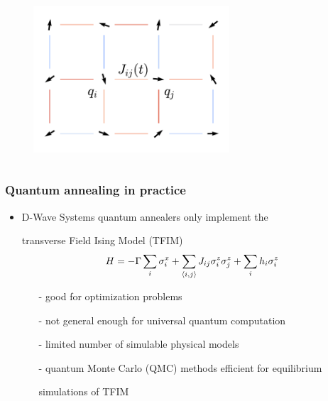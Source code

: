 \documentclass[11pt]{beamer}
\newcommand{\itemb}{\item[$\bullet$]}
\begin{document}
\begin{frame}
\begin{columns}[T]
\begin{column}{0.55\textwidth}
            \begin{figure}[!htb]
                \centering
                \vspace*{-0.3cm}
                \includegraphics[width=0.65\textwidth]{../plots/lattice.pdf}
                \label{fig:annealing}
            \end{figure}
        \end{column}
    \end{columns}
\end{frame}

\begin{frame}
    \frametitle{Quantum annealing in practice}
    \begin{itemize}
        \setlength{\itemindent}{-1em}
        \itemb D-Wave Systems quantum annealers only implement the
        \item [] transverse Field Ising Model (TFIM)
        \begin{equation*}
            H =  - \Gamma \sum_i \sigma_i^x + \sum_{\expval{i,j}} J_{ij} \sigma_i^z \sigma_j^z + \sum_i h_i \sigma_i^z
            \label{eq:tfim}
        \end{equation*}
        \begin{itemize}
            \setlength{\itemindent}{-2em}
            \item[-] good for optimization problems
            \item[-] not general enough for universal quantum computation
            \item[-] limited number of simulable physical models
            \item[-] quantum Monte Carlo (QMC) methods efficient for equilibrium
            \item [] simulations of TFIM
        \end{itemize}
    \end{itemize}
\end{frame}
\end{document}
